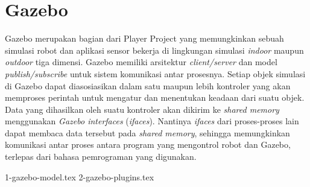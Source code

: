 \section{Gazebo}
\label{sec:gazebo}

Gazebo \citep{cit:koenig2004} merupakan bagian dari Player Project \citep{cit:gerkey2003} yang memungkinkan sebuah simulasi robot dan aplikasi sensor bekerja di lingkungan simulasi \emph{indoor} maupun \emph{outdoor} tiga dimensi.
Gazebo memiliki arsitektur \emph{client/server} dan model \emph{publish/subscribe} untuk sistem komunikasi antar prosesnya.
Setiap objek simulasi di Gazebo dapat diasosiasikan dalam satu maupun lebih kontroler yang akan memproses perintah untuk mengatur dan menentukan keadaan dari suatu objek.
Data yang dihasilkan oleh suatu kontroler akan dikirim ke \emph{shared memory} menggunakan \emph{Gazebo interfaces} (\emph{ifaces}).
Nantinya \emph{ifaces} dari proses-proses lain dapat membaca data tersebut pada \emph{shared memory}, sehingga memungkinkan komunikasi antar proses antara program yang mengontrol robot dan Gazebo, terlepas dari bahasa pemrograman yang digunakan.

{1-gazebo-model.tex}
{2-gazebo-plugins.tex}
